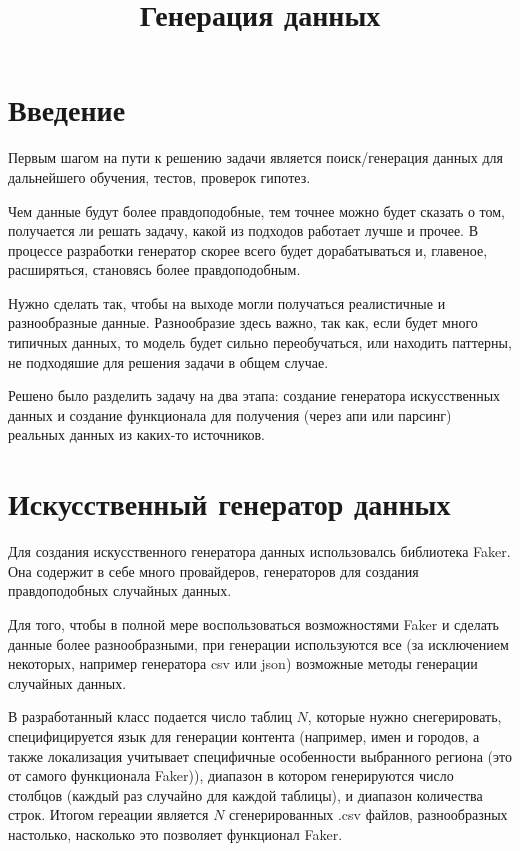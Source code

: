 \documentclass{article}
\title{Генерация данных}
\date{}
\begin{document}
\maketitle

\section*{Введение}
Первым шагом на пути к решению задачи является поиск/генерация данных для дальнейшего обучения, тестов, проверок гипотез.

Чем данные будут более правдоподобные, тем точнее можно будет сказать о том, получается ли решать задачу, какой из подходов работает лучше и прочее. В процессе разработки генератор скорее всего будет дорабатываться и, главеное, расширяться, становясь более правдоподобным.

Нужно сделать так, чтобы на выходе могли получаться реалистичные и разнообразные данные. Разнообразие здесь важно, так как, если будет много типичных данных, то модель будет сильно переобучаться, или находить паттерны, не подходяшие для решения задачи в общем случае.

Решено было разделить задачу на два этапа: создание генератора искусственных данных и создание функционала для получения (через апи или парсинг) реальных данных из каких-то источников.

\section*{Искусственный генератор данных}
Для создания искусственного генератора данных использовалсь библиотека Faker. Она содержит в себе много провайдеров, генераторов для создания правдоподобных случайных данных.

Для того, чтобы в полной мере воспользоваться возможностями Faker и сделать данные более разнообразными, при генерации используются все (за исключением некоторых, например генератора csv или json) возможные методы генерации случайных данных. 

В разработанный класс подается число таблиц $N$, которые нужно снегерировать, специфицируется язык для генерации контента (например, имен и городов, а также локализация учитывает специфичные особенности выбранного региона (это от самого функционала Faker)), диапазон в котором генерируются число столбцов (каждый раз случайно для каждой таблицы), и диапазон количества строк. Итогом гереации является $N$ сгенерированных .csv файлов, разнообразных настолько, насколько это позволяет функционал Faker.
\end{document}
